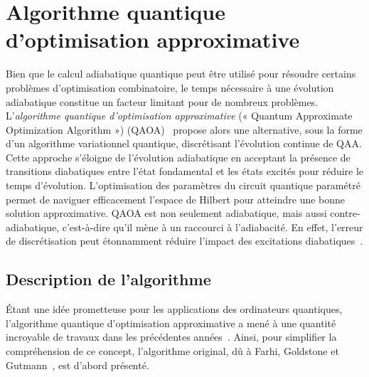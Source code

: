 
\section{Algorithme quantique d'optimisation approximative}
\label{sec:algorithme-quantique-d'optimisation-approximative}

Bien que le calcul adiabatique quantique peut être utilisé pour résoudre certains problèmes d'optimisation combinatoire, le temps nécessaire à une évolution adiabatique constitue un facteur limitant pour de nombreux problèmes. L'\textit{algorithme quantique d'optimisation approximative} (« Quantum Approximate Optimization Algorithm ») (QAOA)~\cite{farhiQuantumApproximateOptimization2014} propose alors une alternative, sous la forme d'un algorithme variationnel quantique, discrétisant l'évolution continue de QAA. Cette approche s'éloigne de l'évolution adiabatique en acceptant la présence de transitions diabatiques entre l'état fondamental et les états excités pour réduire le temps d'évolution. L'optimisation des paramètres du circuit quantique paramétré permet de naviguer efficacement l'espace de Hilbert pour atteindre une bonne solution approximative. QAOA est non seulement adiabatique, mais aussi contre-adiabatique, c'est-à-dire qu'il mène à un raccourci à l'adiabacité. En effet, l'erreur de discrétisation peut étonnamment réduire l'impact des excitations diabatiques~\cite{wurtzCounterdiabaticityQuantumApproximate2022}.


\subsection{Description de l'algorithme}
\label{subsec:description-algorithme}

Étant une idée prometteuse pour les applications des ordinateurs quantiques, l'algorithme quantique d'optimisation approximative a mené à une quantité incroyable de travaux dans les précédentes années~\cite{zhouQuantumApproximateOptimization2020, blekosReviewQuantumApproximate2024}. Ainsi, pour simplifier la compréhension de ce concept, l'algorithme original, dû à Farhi, Goldstone et Gutmann~\cite{farhiQuantumApproximateOptimization2014}, est d'abord présenté.

